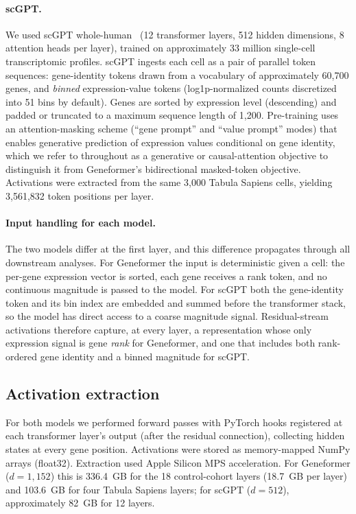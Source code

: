 \paragraph{scGPT.} We used scGPT whole-human~\cite{cui2024scgpt} (12 transformer layers, 512 hidden
dimensions, 8 attention heads per layer), trained on approximately 33 million single-cell
transcriptomic profiles. scGPT ingests each cell as a pair of parallel token sequences:
gene-identity tokens drawn from a vocabulary of approximately 60,700 genes, and \emph{binned}
expression-value tokens (log1p-normalized counts discretized into 51 bins by default). Genes are
sorted by expression level (descending) and padded or truncated to a maximum sequence length of
1,200. Pre-training uses an attention-masking scheme (``gene prompt'' and ``value prompt'' modes)
that enables generative prediction of expression values conditional on gene identity, which we
refer to throughout as a generative or causal-attention objective to distinguish it from
Geneformer's bidirectional masked-token objective. Activations were extracted from the same 3,000
Tabula Sapiens cells, yielding 3,561,832 token positions per layer.

\paragraph{Input handling for each model.} The two models differ at the first layer, and this
difference propagates through all downstream analyses. For Geneformer the input is deterministic
given a cell: the per-gene expression vector is sorted, each gene receives a rank token, and no
continuous magnitude is passed to the model. For scGPT both the gene-identity token and its bin
index are embedded and summed before the transformer stack, so the model has direct access to a
coarse magnitude signal. Residual-stream activations therefore capture, at every layer, a
representation whose only expression signal is gene \emph{rank} for Geneformer, and one that
includes both rank-ordered gene identity and a binned magnitude for scGPT.

\subsection*{Activation extraction}

For both models we performed forward passes with PyTorch hooks registered at each transformer
layer's output (after the residual connection), collecting hidden states at every gene position.
Activations were stored as memory-mapped NumPy arrays (float32). Extraction used Apple Silicon MPS
acceleration. For Geneformer ($d{=}1{,}152$) this is 336.4~GB for the 18 control-cohort layers (18.7~GB per
layer) and 103.6~GB for four Tabula Sapiens layers; for scGPT ($d{=}512$), approximately 82~GB for
12 layers.


